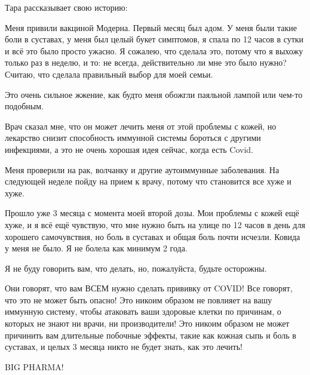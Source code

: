 Тара рассказывает свою историю:

Меня привили вакциной Модерна. Первый месяц был адом. У меня были такие боли в
суставах, у меня был целый букет симптомов, я спала по 12 часов в сутки и всё
это было просто ужасно. Я сожалею, что сделала это, потому что я выхожу только
раз в неделю, и то: не всегда, действительно ли мне это было нужно? Считаю, что
сделала правильный выбор для моей семьи.

Это очень сильное жжение, как будто меня обожгли паяльной лампой или чем-то
подобным.

Врач сказал мне, что он может лечить меня от этой проблемы с кожей, но лекарство
снизит способность иммунной системы бороться с другими инфекциями, а это не
очень хорошая идея сейчас, когда есть Covid.

Меня проверили на рак, волчанку и другие аутоиммунные заболевания. На следующей
неделе пойду на прием к врачу, потому что становится все хуже и хуже.

Прошло уже 3 месяца с момента моей второй дозы. Мои проблемы с кожей ещё хуже, и
я всё ещё чувствую, что мне нужно быть на улице по 12 часов в день для хорошего
самочувствия, но боль в суставах и общая боль почти исчезли. Ковида у меня не
было. Я не болела как минимум 2 года.

Я не буду говорить вам, что делать, но, пожалуйста, будьте осторожны.

Они говорят, что вам ВСЕМ нужно сделать прививку от COVID!  Все говорят, что это
не может быть опасно!  Это никоим образом не повлияет на вашу иммунную систему,
чтобы атаковать ваши здоровые клетки по причинам, о которых не знают ни врачи,
ни производители!  Это никоим образом не может причинить вам длительные побочные
эффекты, такие как кожная сыпь и боль в суставах, и целых 3 месяца никто не
будет знать, как это лечить!

BIG PHARMA!
